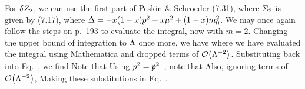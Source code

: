 {	For $\delta Z_2$, we can use the first part of Peskin \& Schroeder (7.31),
	where $\Sigma_2$ is given by (7.17),
	where $\Delta = -x (1 - x) p^2 + x \mu^2 + (1 - x) m_0^2$.  We may once again follow the steps on p.~193 to evaluate the integral, now with $m = 2$.  Changing the upper bound of integration to $\Lambda$ once more, we have
	where we have evaluated the integral using Mathematica and dropped terms of $\order{\Lam^{-2}}$.  Substituting back into Eq.~, we find
	Note that
	Using $p^2 = \slashed{p}^2$~\cite[p.~220]{Peskin}, note that
	Also, ignoring terms of $\order{\Lam^{-2}}$,
	Making these substitutions in Eq.~,
}
